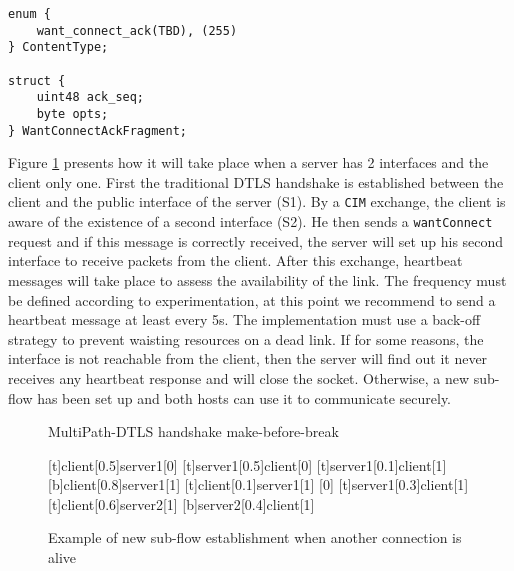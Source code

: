\begin{lstlisting}[caption= wantConnectAck message, label=lst:WantConnectAck]
enum {
    want_connect_ack(TBD), (255)
} ContentType;

struct {
    uint48 ack_seq;
    byte opts;
} WantConnectAckFragment;
\end{lstlisting}

Figure \ref{fig:Handshake1} presents how it will take place when a server has 2 interfaces and the client only one. First the traditional DTLS handshake is established between the client and the public interface of the server (S1). By a \texttt{CIM} exchange, the client is aware of the existence of a second interface (S2). He then sends a \texttt{wantConnect} request and if this message is correctly received, the server will set up his second interface to receive packets from the client. After this exchange, heartbeat messages will take place to assess the availability of the link. The frequency must be defined according to experimentation, at this point we recommend to send a heartbeat message at least every 5s. The implementation must use a back-off strategy to prevent waisting resources on a dead link. If for some reasons, the interface is not reachable from the client, then the server will find out it never receives any heartbeat response and will close the socket. Otherwise, a new sub-flow has been set up and both hosts can use it to communicate securely. 


\begin{figure}[!ht]
\centering
\begin{msc}[r]{MultiPath-DTLS handshake make-before-break}

\setlength{\instfootheight}{0em}
\setlength{\instheadheight}{0em}
\setlength{\instdist}{0.33\linewidth}
\setlength{\levelheight}{3em}


[t]{client}[0.5]{server1}[0]
\nextlevel
{}[t]{server1}[0.5]{client}[0]
\nextlevel
{}[t]{server1}[0.1]{client}[1]
\nextlevel
{}[b]{client}[0.8]{server1}[1]
\nextlevel[2]
[t]{client}[0.1]{server1}[1]
\nextlevel
{}
[0]
[t]{server1}[0.3]{client}[1]
\nextlevel
{}
\nextlevel
{}[t]{client}[0.6]{server2}[1]
\nextlevel
{}[b]{server2}[0.4]{client}[1]
\nextlevel[2]

\end{msc}
\caption{Example of new sub-flow establishment when another connection is alive}
\label{fig:Handshake1}
\end{figure}

